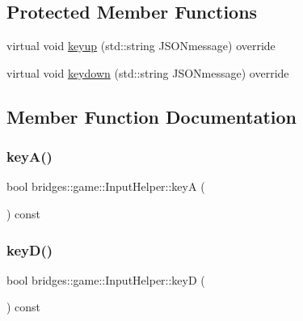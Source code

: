 \subsection*{Protected Member Functions}
\begin{DoxyCompactItemize}
\item 
virtual void \mbox{\hyperlink{classbridges_1_1game_1_1_input_helper_aa847f19c6f68ebbb63d73802abfcd9a0}{keyup}} (std\+::string J\+S\+O\+Nmessage) override
\item 
virtual void \mbox{\hyperlink{classbridges_1_1game_1_1_input_helper_aac75c2b1abf28afa4acaf730e925f301}{keydown}} (std\+::string J\+S\+O\+Nmessage) override
\end{DoxyCompactItemize}


\subsection{Member Function Documentation}
\mbox{\label{classbridges_1_1game_1_1_input_helper_a168770e762b33e32597f9f7294082d9b}} 
\subsubsection{\texorpdfstring{keyA()}{keyA()}}
{\footnotesize\ttfamily bool bridges\+::game\+::\+Input\+Helper\+::keyA (\begin{DoxyParamCaption}{ }\end{DoxyParamCaption}) const\hspace{0.3cm}{\ttfamily [inline]}}

\mbox{\label{classbridges_1_1game_1_1_input_helper_af7247d84254d706e3a309db2f4c20e9b}} 
\subsubsection{\texorpdfstring{keyD()}{keyD()}}
{\footnotesize\ttfamily bool bridges\+::game\+::\+Input\+Helper\+::keyD (\begin{DoxyParamCaption}{ }\end{DoxyParamCaption}) const\hspace{0.3cm}{\ttfamily [inline]}}

